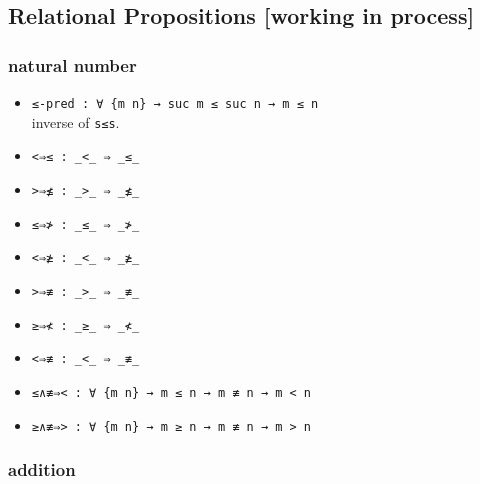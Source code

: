 \documentclass[../thesis.tex]{subfiles}
\begin{document}
\subsection{Relational Propositions [working in process]}

\subsubsection{natural number}

\begin{itemize}
    \item {\lstinline|≤-pred : ∀ {m n} → suc m ≤ suc n → m ≤ n|}
        \\ inverse of {\lstinline|s≤s|}.
    \item {\lstinline|<⇒≤ : _<_ ⇒ _≤_|}
    \item {\lstinline|>⇒≰ : _>_ ⇒ _≰_|}
    \item {\lstinline|≤⇒≯ : _≤_ ⇒ _≯_|}
    \item {\lstinline|<⇒≱ : _<_ ⇒ _≱_|}
    \item {\lstinline|>⇒≢ : _>_ ⇒ _≢_|}
    \item {\lstinline|≥⇒≮ : _≥_ ⇒ _≮_|}
    \item {\lstinline|<⇒≢ : _<_ ⇒ _≢_|}
    \item {\lstinline|≤∧≢⇒< : ∀ {m n} → m ≤ n → m ≢ n → m < n|}
    \item {\lstinline|≥∧≢⇒> : ∀ {m n} → m ≥ n → m ≢ n → m > n|}
\end{itemize}

\subsubsection{addition}
\end{document}
